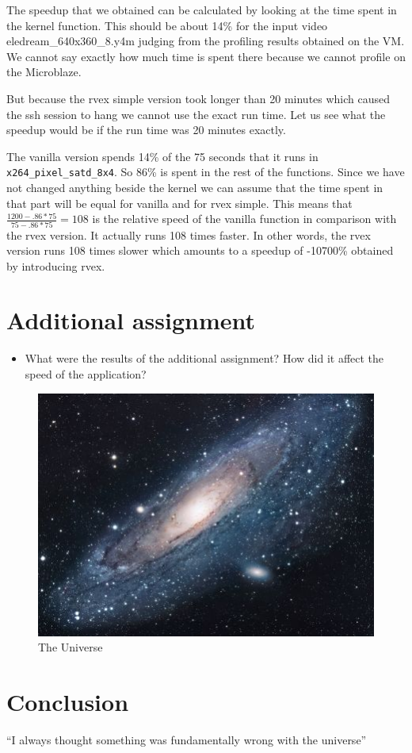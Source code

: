 \documentclass{article}
\newcommand{\satd}{\texttt{x264\_pixel\_satd\_8x4}}
\begin{document}
The speedup that we obtained can be calculated by looking at the time spent in the kernel function. This should be about 14\% for the input video eledream\_640x360\_8.y4m judging from the profiling results obtained on the VM. We cannot say exactly how much time is spent there because we cannot profile on the Microblaze. 

But because the rvex simple version took longer than 20 minutes which caused the ssh session to hang we cannot use the exact run time. Let us see what the speedup would be if the run time was 20 minutes exactly. 

The vanilla version spends 14\% of the 75 seconds that it runs in \satd{}. So 86\% is spent in the rest of the functions. Since we have not changed anything beside the kernel we can assume that the time spent in that part will be equal for vanilla and for rvex simple. This means that $\frac{1200 - .86*75}{75 - .86*75} = 108$ is the relative speed of the vanilla function in comparison with the rvex version. It actually runs 108 times faster. In other words, the rvex version runs 108 times slower which amounts to a speedup of -10700\% obtained by introducing rvex. 

\section{Additional assignment}

\begin{itemize}
  \item What were the results of the additional assignment? How did it affect
        the speed of the application?
\end{itemize}

\begin{figure}[h!]
  \centering
  \includegraphics[scale=1.7]{universe.jpg}
  \caption{The Universe}
  \label{threadsVsSync}
\end{figure}

\section{Conclusion}

``I always thought something was fundamentally wrong with the universe'' \citep{adams1995hitchhiker}



\end{document}
